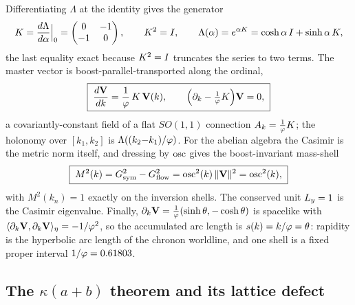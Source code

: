 Differentiating $\Lambda$ at the identity gives the generator
\begin{equation}
K=\frac{d\Lambda}{d\alpha}\Big|_0=\begin{pmatrix}0&-1\\-1&0\end{pmatrix},\qquad
K^2=I,\qquad \Lambda(\alpha)=e^{\alpha K}=\cosh\alpha\,I+\sinh\alpha\,K,
\label{eq:twovector:K}
\end{equation}
the last equality exact because $K^2=I$ truncates the series to two terms. The master
vector is boost-parallel-transported along the ordinal,
\begin{equation}
\boxed{\;\frac{d\mathbf{V}}{dk}=\frac{1}{\varphi}\,K\,\mathbf{V}(k),\qquad
\Big(\partial_k-\tfrac{1}{\varphi}K\Big)\mathbf{V}=0,\;}
\label{eq:twovector:transport}
\end{equation}
a covariantly-constant field of a flat $SO(1,1)$ connection $A_k=\tfrac{1}{\varphi}K$;
the holonomy over $[k_1,k_2]$ is $\Lambda((k_2{-}k_1)/\varphi)$. For the abelian algebra the
Casimir is the metric norm itself, and dressing by $\operatorname{osc}$ gives the boost-invariant mass-shell
\begin{equation}
\boxed{\;M^2(k)=G_{\mathrm{sym}}^2-G_{\mathrm{flow}}^2=\operatorname{osc}^2(k)\,\|\mathbf{V}\|^2=\operatorname{osc}^2(k),\;}
\label{eq:twovector:casimir}
\end{equation}
with $M^2(k_n)=1$ exactly on the inversion shells. The conserved unit $L_{y}=1$ is the Casimir
eigenvalue. Finally, $\partial_k\mathbf{V}=\tfrac1{\varphi}(\sinh\theta,-\cosh\theta)$ is spacelike with
$\langle\partial_k\mathbf{V},\partial_k\mathbf{V}\rangle_\eta=-1/\varphi^2$, so the accumulated arc length
is $s(k)=k/\varphi=\theta$: rapidity is the hyperbolic arc length of the chronon worldline, and one
shell is a fixed proper interval $1/\varphi=0.61803$.

\subsection{The $\kappa(a{+}b)$ theorem and its lattice defect}

